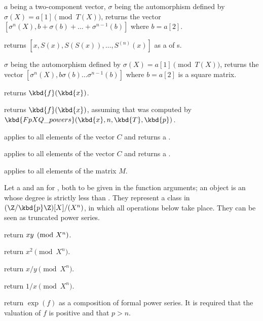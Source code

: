 $a$ being a two-component vector,
$\sigma$ being the automorphism defined by $\sigma(X)=a[1]\pmod{T(X)}$,
returns the vector $[\sigma^n(X),b+\sigma(b)+\ldots+\sigma^{n-1}(b)]$
where $b=a[2]$.

 returns
$[x,S(x),S(S(x)),\dots,S^{(n)}(x)]$ as a  of s.

$\sigma$ being the automorphism defined by $\sigma(X)=a[1]\pmod{T(X)}$,
returns the vector $[\sigma^n(X),b\sigma(b)\ldots\sigma^{n-1}(b)]$
where $b=a[2]$ is a square matrix.

 returns
$\kbd{f}(\kbd{x})$.

 returns
$\kbd{f}(\kbd{x})$, assuming that  was computed by
$\kbd{FpXQ\_powers}(\kbd{x}, n, \kbd{T}, \kbd{p})$.

 applies
 to all elements of the vector $C$
and returns a .

 applies
 to all elements of the vector $C$
and returns a .

 applies
 to all elements of the matrix $M$.

 Let  a  and  an
 for , both to be given in the function arguments; an 
object is an  whose degree is strictly less than .
They represent a class in $(\Z/\kbd{p}\Z)[X] / (X^n)$, in which all operations
below take place. They can be seen as truncated power series.

 return $x\*y\pmod{X^n}$.

 return $x^2\pmod{X^n}$.

 return $x/y\pmod{X^n}$.

 return $1/x\pmod{X^n}$.

 return $\exp(f)$
as a composition of formal power series.
It is required that the valuation of $f$ is positive and that $p>n$.

